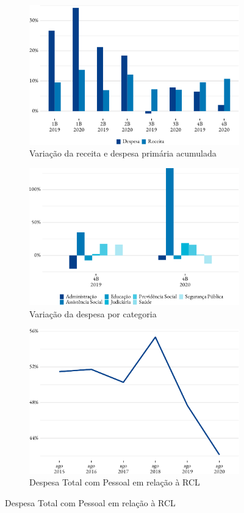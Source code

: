 \begin{figure}[!h]
	\begin{subfigure}{\linewidth}
		\caption{\label{fig:var_receita_despesa_primaria}Variação da receita e despesa primária acumulada}
		\includegraphics{fig/var_receita_despesa_primaria-1.pdf}
	\end{subfigure}
	\begin{subfigure}{\linewidth}
		\caption{\label{fig:var_despesa_categoria}Variação da despesa por categoria}
		\includegraphics{fig/var_despesa_categoria-1.pdf}
	\end{subfigure}
	\begin{subfigure}{\linewidth}
		\caption{\label{fig:}Despesa Total com Pessoal em relação à RCL}
		\includegraphics{fig/desp_pessoal_rcl-1.pdf}

\end{subfigure}
\end{figure}
